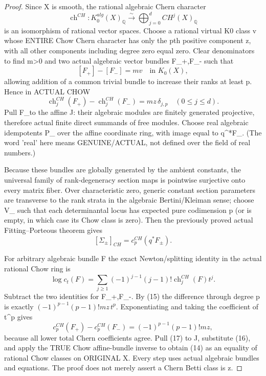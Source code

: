 \documentclass[11pt]{article}
\begin{document}
\begin{proof}
Since X is smooth,
the rational algebraic
Chern character
\[
 \operatorname{ch}^{CH}:
 K_0^{alg}(X)_\mathbb Q
 \overset{\sim}{\longrightarrow}
 \bigoplus_{j=0}^d
              CH^j(X)_\mathbb Q
\]
is an isomorphism
of rational vector
spaces. Choose a
rational virtual K0
class v whose ENTIRE
Chow Chern character
has only the pth
positive component z,
with all other
components including
degree zero equal zero.
Clear denominators
to find m>0 and
two actual algebraic
vector bundles F_+,F_-
such that
\[
 [F_+]-[F_-]=m v
 \quad\text{in }K_0(X),
\]
allowing addition of
a common trivial
bundle to increase
their ranks at least p.
Hence in ACTUAL CHOW
\[
 \operatorname{ch}_j^{CH}(F_+)
 -\operatorname{ch}_j^{CH}(F_-)
 =m z\,\delta_{j,p}
           \quad (0\le j\le d).
                                                               \tag{15}
\]
Pull F_\pm to the
affine J: their
algebraic modules are
finitely generated
projective, therefore
actual finite
direct summands of
free modules. Choose
real algebraic
idempotents P_\pm
over the affine
coordinate ring,
with image equal to
q^*F_\pm.
(The word 'real'
here means
GENUINE/ACTUAL,
not defined over
the field of real
numbers.)

Because these
bundles are globally
generated by the
ambient constants,
the universal family
of rank-degeneracy
section maps is
pointwise surjective
onto every matrix
fiber. Over
characteristic zero,
generic constant
section parameters
are transverse to
the rank strata
in the algebraic
Bertini/Kleiman
sense; choose V_\pm
such that each
determinantal locus
has expected pure
codimension p
(or is empty, in
which case its
Chow class is zero).
Then the previously
proved actual
Fitting--Porteous
theorem gives
\[
 [\Sigma_\pm]_{CH}
       =c_p^{CH}(q^*F_\pm).
                                                               \tag{16}
\]

For arbitrary algebraic
bundle F the exact
Newton/splitting
identity in the
actual rational
Chow ring is
\[
 \log c_t(F)=
   \sum_{j\ge1}
   (-1)^{j-1}(j-1)!
        \operatorname{ch}_j^{CH}(F)t^j .
\]
Subtract the two
identities for
F_+,F_-.
By (15) the
difference through
degree p is exactly
$(-1)^{p-1}(p-1)!
m z\,t^p$.
Exponentiating and
taking the coefficient
of t^p gives
\[
 c_p^{CH}(F_+)
     -c_p^{CH}(F_-)
   =(-1)^{p-1}(p-1)!m z,
                                                               \tag{17}
\]
because all lower
total Chern
coefficients agree.
Pull (17) to J,
substitute (16),
and apply the TRUE
Chow affine-bundle
inverse to obtain
(14) as an equality
of rational Chow
classes on ORIGINAL X.
Every step uses
actual algebraic
bundles and
equations. The proof
does not merely
assert a Chern
Betti class is z.
\end{proof}
\end{document}
